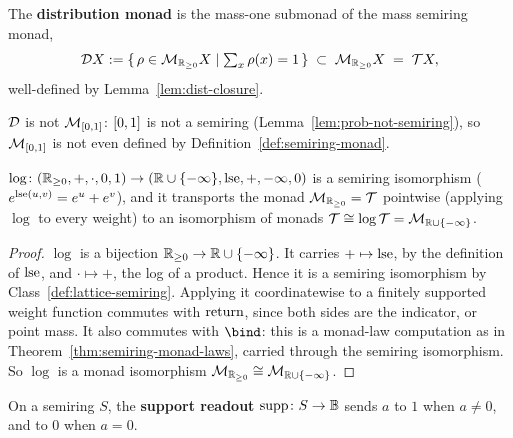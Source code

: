 \begin{definition}
\label{def:dist-monad}
\leanok
The \textbf{distribution monad} is the mass-one submonad of the mass
semiring monad,
\[
  \mathcal D X := \{\, \rho \in \mathcal M_{\mathbb R_{\ge 0}} X \mid \textstyle\sum_x \rho(x) = 1 \,\}
  \;\subset\; \mathcal M_{\mathbb R_{\ge 0}} X \;=\; \mathcal T X,
\]
well-defined by Lemma~\ref{lem:dist-closure}.
\end{definition}

$\mathcal D$ is not $\mathcal M_{[0,1]}$: $[0,1]$ is not a semiring
(Lemma~\ref{lem:prob-not-semiring}), so $\mathcal M_{[0,1]}$ is not even
defined by Definition~\ref{def:semiring-monad}.

\begin{definition}
\label{lem:log-iso}
\leanok
$\log \colon (\mathbb R_{\ge 0}, +, \cdot, 0, 1) \to (\mathbb R \cup \{-\infty\}, \operatorname{lse}, +, -\infty, 0)$
is a semiring isomorphism ($e^{\operatorname{lse}(u,v)} = e^u+e^v$), and it
transports the monad $\mathcal M_{\mathbb R_{\ge 0}} = \mathcal T$ pointwise (applying $\log$
to every weight) to an isomorphism of monads
$\mathcal T \cong \log\mathcal T = \mathcal M_{\mathbb R \cup \{-\infty\}}$.
\end{definition}

\begin{proof}
\leanok
$\log$ is a bijection $\mathbb R_{\ge 0} \to \mathbb R \cup \{-\infty\}$. It carries $+ \mapsto \operatorname{lse}$,
by the definition of $\operatorname{lse}$, and $\cdot \mapsto +$, the log of a
product. Hence it is a semiring isomorphism by
Class~\ref{def:lattice-semiring}. Applying it coordinatewise to a
finitely supported weight function commutes with $\mathrm{return}$, since both
sides are the indicator, or point mass. It also commutes with $\bind$:
this is a monad-law computation as in
Theorem~\ref{thm:semiring-monad-laws}, carried through the semiring
isomorphism. So $\log$ is a monad isomorphism
$\mathcal M_{\mathbb R_{\ge 0}} \cong \mathcal M_{\mathbb R \cup \{-\infty\}}$.
\end{proof}

\begin{definition}
\label{def:support-readout}
\leanok
On a semiring $S$, the \textbf{support readout}
$\mathrm{supp} \colon S \to \mathbb B$ sends $a$ to $1$ when $a \ne 0$, and
to $0$ when $a = 0$.
\end{definition}

